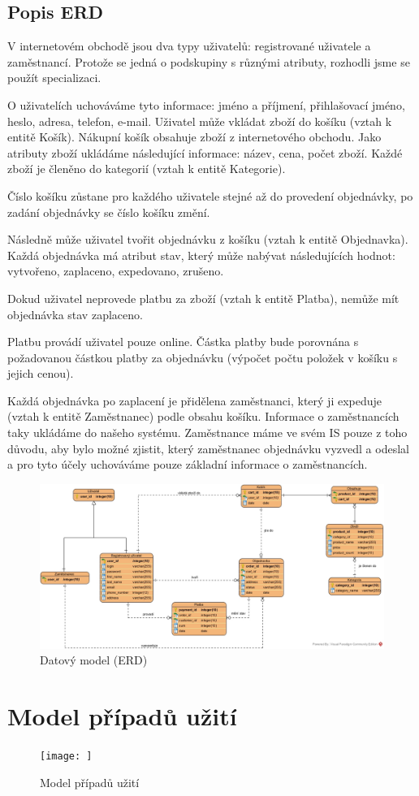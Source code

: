 \documentclass[12pt, a4paper]{article}
\begin{document}
\subsection{Popis ERD}

V internetovém obchodě jsou dva typy uživatelů: registrované uživatele a zaměstnancí. Protože se jedná o podskupiny s různými atributy, rozhodli jsme se použít specializaci.

O uživatelích uchováváme tyto informace: jméno a příjmení, přihlašovací jméno, heslo, adresa, telefon, e-mail.
Uživatel může vkládat zboží do košíku (vztah k entitě Košík). Nákupní košík obsahuje zboží z internetového obchodu. Jako atributy zboží ukládáme následující informace: název, cena, počet zboží. Každé zboží je členěno do kategorií (vztah k entitě Kategorie).

Číslo košíku zůstane pro každého uživatele stejné až do provedení objednávky, po zadání objednávky se číslo košíku změní.

Následně může uživatel  tvořit objednávku z košíku (vztah k entitě Objednavka). Každá objednávka má atribut stav, který může nabývat následujících hodnot: vytvořeno, zaplaceno, expedovano, zrušeno. 

Dokud uživatel neprovede platbu za zboží (vztah k entitě Platba), nemůže mít objednávka stav zaplaceno. 

Platbu provádí uživatel pouze online. Částka platby bude porovnána s požadovanou částkou platby za objednávku (výpočet počtu položek v košíku s jejich cenou).

Každá objednávka po zaplacení je přidělena zaměstnanci, který ji expeduje (vztah k entitě Zaměstnanec) podle obsahu košíku.
Informace o zaměstnancích taky ukládáme do našeho systému. Zaměstnance máme ve svém IS pouze z toho důvodu, aby bylo možné zjistit, který zaměstnanec objednávku vyzvedl a odeslal a pro tyto účely uchováváme pouze základní informace o zaměstnancích.

 \begin{landscape}
 \begin{figure}[!ht]
    \centering
    \includegraphics[width=1\linewidth]{IDS_ER_diagram.jpg}
    \caption{Datový model (ERD)}
    \label{figure:ast_example1}
\end{figure}

\end{landscape}

\newpage
\section{Model případů užití}


 \begin{figure}[!ht]
    \centering
    \texttt{[image: ]}
    \caption{Model případů užití}
    \label{figure:ast_example1}
\end{figure}
\end{document}
